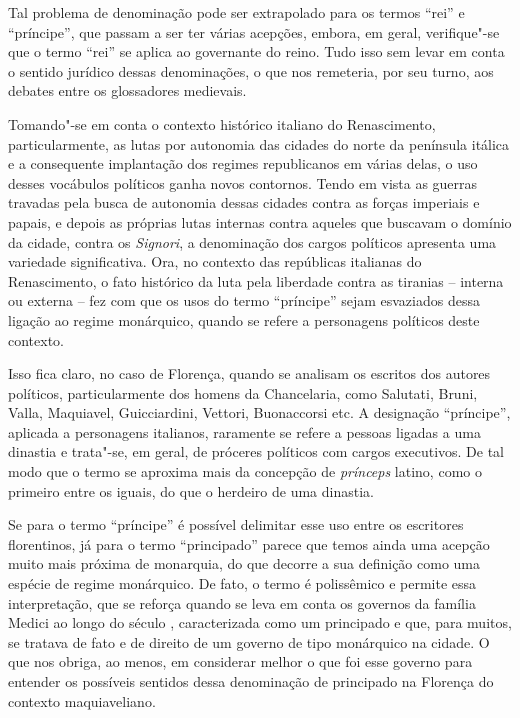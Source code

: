 Tal problema de denominação pode ser extrapolado para os termos ``rei''
e ``príncipe'', que passam a ser ter várias acepções, embora, em geral,
verifique"-se que o termo ``rei'' se aplica ao governante do reino. Tudo
isso sem levar em conta o sentido jurídico dessas denominações, o que
nos remeteria, por seu turno, aos debates entre os glossadores
medievais.

Tomando"-se em conta o contexto histórico italiano do Renascimento,
particularmente, as lutas por autonomia das cidades do norte da
península itálica e a consequente implantação dos regimes republicanos
em várias delas, o uso desses vocábulos políticos ganha novos contornos.
Tendo em vista as guerras travadas pela busca de autonomia dessas
cidades contra as forças imperiais e papais, e depois as próprias lutas
internas contra aqueles que buscavam o domínio da cidade, contra os
\emph{Signori}, a denominação dos cargos políticos apresenta uma
variedade significativa. Ora, no contexto das repúblicas italianas do
Renascimento, o fato histórico da luta pela liberdade contra as tiranias
-- interna ou externa -- fez com que os usos do termo ``príncipe'' sejam
esvaziados dessa ligação ao regime monárquico, quando se refere a
personagens políticos deste contexto.

Isso fica claro, no caso de Florença, quando se analisam os escritos dos
autores políticos, particularmente dos homens da Chancelaria, como
Salutati, Bruni, Valla, Maquiavel, Guicciardini, Vettori, Buonaccorsi
etc. A designação ``príncipe'', aplicada a personagens italianos,
raramente se refere a pessoas ligadas a uma dinastia e trata"-se, em
geral, de próceres políticos com cargos executivos. De tal modo que o
termo se aproxima mais da concepção de \emph{prínceps} latino, como o
primeiro entre os iguais, do que o herdeiro de uma dinastia.

Se para o termo ``príncipe'' é possível delimitar esse uso entre os
escritores florentinos, já para o termo ``principado'' parece que temos
ainda uma acepção muito mais próxima de monarquia, do que decorre a sua
definição como uma espécie de regime monárquico. De fato, o termo é
polissêmico e permite essa interpretação, que se reforça quando se leva
em conta os governos da família Medici ao longo do século ,
caracterizada como um principado e que, para muitos, se tratava de fato
e de direito de um governo de tipo monárquico na cidade. O que nos
obriga, ao menos, em considerar melhor o que foi esse governo para
entender os possíveis sentidos dessa denominação de principado na
Florença do contexto maquiaveliano.

